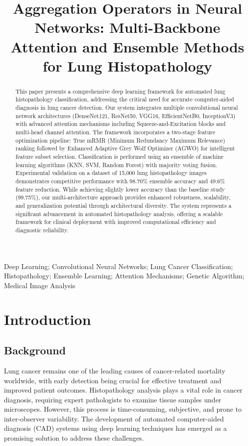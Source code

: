 \documentclass[journal]{IEEEtran}
\title{Aggregation Operators in Neural Networks: Multi-Backbone Attention and Ensemble Methods for Lung Histopathology}
\author{
    \IEEEauthorblockN{Anshul Saxena (2022B4A71041H), Advik Kashi Vishwanath (2022B4A70973H), Kritii Gupta (2022B4A70757H)}
    \IEEEauthorblockA{
        Supervisor: Prof. Swati Hait\\
        Department of Mathematics, BITS Pilani Hyderabad Campus\\
        Code: \url{https://github.com/anshull-saxena/lung_cancer}
    }
}
\begin{document}
\maketitle

\begin{abstract}
This paper presents a comprehensive deep learning framework for automated lung histopathology classification, addressing the critical need for accurate computer-aided diagnosis in lung cancer detection. Our system integrates multiple convolutional neural network architectures (DenseNet121, ResNet50, VGG16, EfficientNetB0, InceptionV3) with advanced attention mechanisms including Squeeze-and-Excitation blocks and multi-head channel attention. The framework incorporates a two-stage feature optimization pipeline: True mRMR (Minimum Redundancy Maximum Relevance) ranking followed by Enhanced Adaptive Grey Wolf Optimizer (AGWO) for intelligent feature subset selection. Classification is performed using an ensemble of machine learning algorithms (KNN, SVM, Random Forest) with majority voting fusion. Experimental validation on a dataset of 15,000 lung histopathology images demonstrates competitive performance with 98.70\% ensemble accuracy and 49.6\% feature reduction. While achieving slightly lower accuracy than the baseline study (99.75\%), our multi-architecture approach provides enhanced robustness, scalability, and generalization potential through architectural diversity. The system represents a significant advancement in automated histopathology analysis, offering a scalable framework for clinical deployment with improved computational efficiency and diagnostic reliability.
\end{abstract}

\begin{IEEEkeywords}
Deep Learning; Convolutional Neural Networks; Lung Cancer Classification; Histopathology; Ensemble Learning; Attention Mechanisms; Genetic Algorithm; Medical Image Analysis
\end{IEEEkeywords}

\section{Introduction}

\subsection{Background}

Lung cancer remains one of the leading causes of cancer-related mortality worldwide, with early detection being crucial for effective treatment and improved patient outcomes. Histopathology analysis plays a vital role in cancer diagnosis, requiring expert pathologists to examine tissue samples under microscopes. However, this process is time-consuming, subjective, and prone to inter-observer variability. The development of automated computer-aided diagnosis (CAD) systems using deep learning techniques has emerged as a promising solution to address these challenges.
\end{document}
